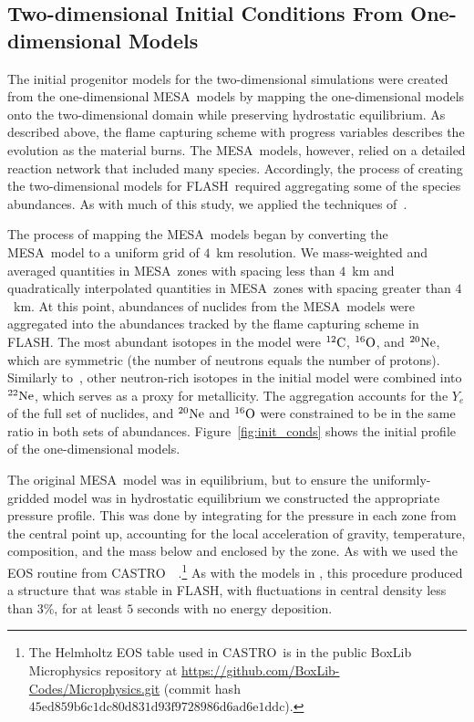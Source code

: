 \documentclass[iop,apj]{emulateapj}
\newcommand{\figref}[1]{Figure~\ref{#1}}
\newcommand{\C}[1]{\ensuremath{{}^{#1}{\rm C}}}
\newcommand{\Ox}[1]{\ensuremath{{}^{#1}{\rm O}}}
\newcommand{\Ne}[1]{\ensuremath{{}^{#1}{\rm Ne}}}
\newcommand{\code}[1]{\textsc{#1}}
\newcommand{\FLASH}{\code{FLASH}}
\newcommand{\CASTRO}{\code{CASTRO}}
\newcommand{\MESA}{\code{MESA}}
\begin{document}
\subsection{Two-dimensional Initial Conditions From One-dimensional Models}

The initial progenitor models for the two-dimensional simulations were
created from the one-dimensional \MESA\ models by mapping the one-dimensional
models onto the two-dimensional domain while
preserving hydrostatic equilibrium.
As described above, the flame capturing scheme with progress
variables describes the evolution as the material burns. The \MESA\
models, however, relied on a detailed reaction network that included
many species. Accordingly, the process of creating the two-dimensional
models for \FLASH\ required aggregating some of the species abundances.
As with much of this study, we applied the
techniques of~\citet{willcoxetal2016}.


The process of mapping the \MESA\ models began by converting
the \MESA\ model to a uniform grid of $4$~km resolution.
{\color{blue}We mass-weighted and averaged quantities in \MESA\ zones with spacing less than $4$~km
and quadratically interpolated quantities in \MESA\ zones with spacing greater than $4$~km.}
At this point,
abundances of nuclides from the \MESA\ models were aggregated
into the abundances tracked by the flame capturing scheme in
\FLASH.
The most abundant isotopes in the model were \C{12}, \Ox{16},
and \Ne{20}, which are symmetric (the number of neutrons
equals the number of protons). Similarly to~\citet{willcoxetal2016},
other neutron-rich isotopes in the initial model were combined into
\Ne{22}, which serves as a proxy for metallicity. The aggregation
accounts for the $Y_e$ of the full set of nuclides, and \Ne{20}
and \Ox{16} were constrained to be in the same ratio in both
sets of abundances. \figref{fig:init_conds} shows the initial
profile of the one-dimensional models.

The original \MESA\ model was in equilibrium, but to ensure
the uniformly-gridded model was in hydrostatic equilibrium we
constructed the appropriate pressure profile. This was done by
integrating for the pressure in each zone from the central point up,
accounting for the local acceleration of gravity, temperature,
composition, and the mass below and enclosed by the zone. As
with \citet{willcoxetal2016} we used the EOS routine from
\CASTRO\ ~\citep{timmes.swesty:accuracy,castro1}.\footnote{The
Helmholtz EOS table used in \CASTRO\ is in the public BoxLib
Microphysics repository at
  \url{https://github.com/BoxLib-Codes/Microphysics.git} (commit
  hash $\mathrm{45ed859b6c1dc80d831d93f9728986d6ad6e1ddc}$).} As
 with the models in \citet{willcoxetal2016}, this procedure produced
 a structure that was stable in \FLASH, with fluctuations in central
density less than $3\%$, for at least $5$ seconds with no energy
deposition.
\end{document}
